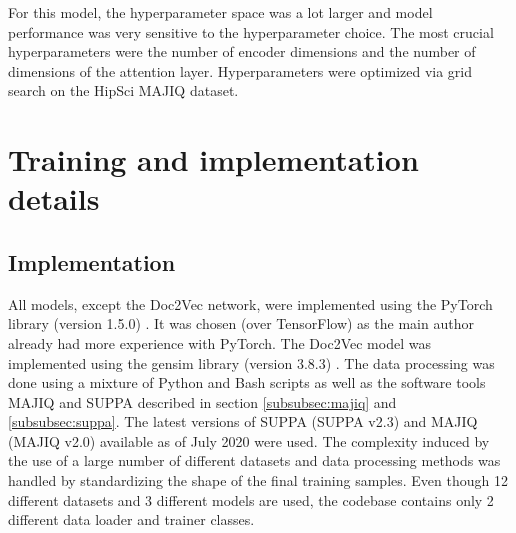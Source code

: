 
For this model, the hyperparameter space was a lot larger and model performance was very sensitive to the hyperparameter choice. The most crucial hyperparameters were the number of encoder dimensions and the number of dimensions of the attention layer. Hyperparameters were optimized via grid search on the HipSci MAJIQ dataset.


\section{Training and implementation details} \label{sec:implementation_details}
\subsection{Implementation} \label{subsec:implementation_details}
All models, except the Doc2Vec network, were implemented using the PyTorch library (version 1.5.0) \cite{pytorch}. It was chosen (over TensorFlow) as the main author already had more experience with PyTorch. The Doc2Vec model was implemented using the gensim library (version 3.8.3) \cite{gensim}. The data processing was done using a mixture of Python and Bash scripts as well as the software tools MAJIQ and SUPPA described in section \ref{subsubsec:majiq} and \ref{subsubsec:suppa}. The latest versions of SUPPA (SUPPA v2.3) and MAJIQ (MAJIQ v2.0) available as of July 2020 were used. The complexity induced by the use of a large number of different datasets and data processing methods was handled by standardizing the shape of the final training samples. Even though 12 different datasets and 3 different models are used, the codebase contains only 2 different data loader and trainer classes.


